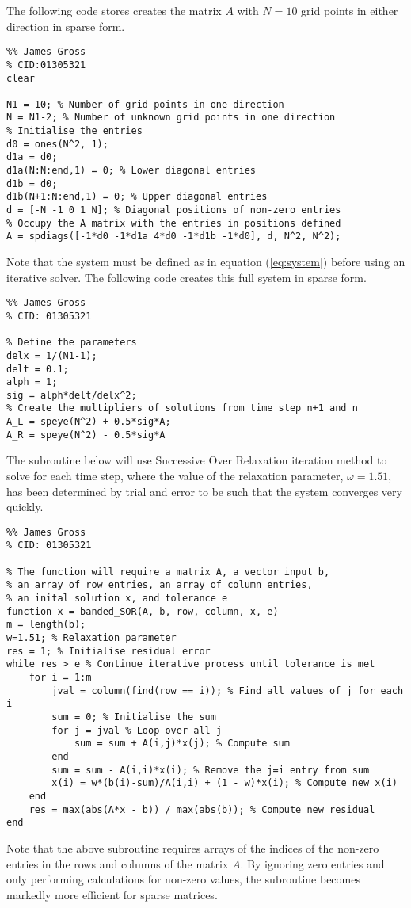 \documentclass[12pt]{article}
\begin{document}
The following code stores creates the matrix $A$ with $N=10$ grid points in either direction in sparse form.
\begin{lstlisting}
%% James Gross
% CID:01305321
clear

N1 = 10; % Number of grid points in one direction
N = N1-2; % Number of unknown grid points in one direction
% Initialise the entries
d0 = ones(N^2, 1);
d1a = d0;
d1a(N:N:end,1) = 0; % Lower diagonal entries
d1b = d0;
d1b(N+1:N:end,1) = 0; % Upper diagonal entries
d = [-N -1 0 1 N]; % Diagonal positions of non-zero entries
% Occupy the A matrix with the entries in positions defined
A = spdiags([-1*d0 -1*d1a 4*d0 -1*d1b -1*d0], d, N^2, N^2);
\end{lstlisting}
Note that the system must be defined as in equation (\ref{eq:system}) before using an iterative solver. The following code creates this full system in sparse form.
\begin{lstlisting}
%% James Gross
% CID: 01305321

% Define the parameters
delx = 1/(N1-1);
delt = 0.1;
alph = 1;
sig = alph*delt/delx^2;
% Create the multipliers of solutions from time step n+1 and n
A_L = speye(N^2) + 0.5*sig*A;
A_R = speye(N^2) - 0.5*sig*A
\end{lstlisting}
The subroutine below will use Successive Over Relaxation iteration method to solve for each time step, where the value of the relaxation parameter, $\omega = 1.51$, has been determined by trial and error to be such that the system converges very quickly.
\begin{lstlisting}
%% James Gross
% CID: 01305321

% The function will require a matrix A, a vector input b,
% an array of row entries, an array of column entries,
% an inital solution x, and tolerance e
function x = banded_SOR(A, b, row, column, x, e) 
m = length(b);
w=1.51; % Relaxation parameter
res = 1; % Initialise residual error 
while res > e % Continue iterative process until tolerance is met
    for i = 1:m
        jval = column(find(row == i)); % Find all values of j for each i
        sum = 0; % Initialise the sum
        for j = jval % Loop over all j
            sum = sum + A(i,j)*x(j); % Compute sum
        end
        sum = sum - A(i,i)*x(i); % Remove the j=i entry from sum
        x(i) = w*(b(i)-sum)/A(i,i) + (1 - w)*x(i); % Compute new x(i)
    end
    res = max(abs(A*x - b)) / max(abs(b)); % Compute new residual
end

\end{lstlisting}
Note that the above subroutine requires arrays of the indices of the non-zero entries in the rows and columns of the matrix $A$. By ignoring zero entries and only performing calculations for non-zero values, the subroutine becomes markedly more efficient for sparse matrices.
\end{document}
